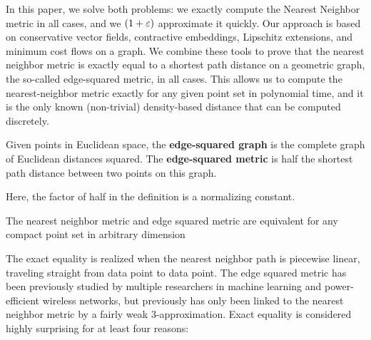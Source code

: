 In this paper, we solve both problems: we exactly compute the Nearest
Neighbor metric in all cases, and we $(1+\varepsilon)$ approximate it quickly.
Our approach is
based on conservative vector fields, contractive embeddings, Lipschitz
extensions, and minimum cost
flows on a graph. We combine these tools to prove that the nearest neighbor
metric is exactly equal to a shortest path distance on a geometric graph,
the so-called edge-squared metric, in all cases. This allows us to compute
the nearest-neighbor metric exactly for any given point set in polynomial
time, and it is the only known (non-trivial) density-based distance that can be computed
discretely.


\begin{definition} Given points in Euclidean space, the
\textbf{edge-squared graph} is the complete graph of Euclidean distances
squared. The \textbf{edge-squared metric} is half the shortest path distance
between two points on this graph. \end{definition}

Here, the factor of half in the definition is a normalizing constant.

\begin{theorem}\label{thm:NN} The nearest neighbor metric and edge squared
metric are equivalent for any compact point set in arbitrary dimension
\end{theorem}

The exact equality is realized when the nearest neighbor path is piecewise
linear, traveling straight from data point to data point. The edge squared
metric has been previously studied by multiple researchers in machine
learning and power-efficient wireless networks, but previously has only
been linked to the nearest neighbor metric by a fairly weak
3-approximation. Exact equality is considered highly surprising for at
least four reasons:

